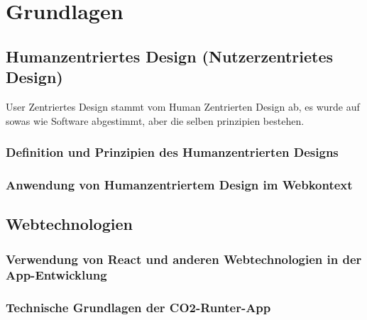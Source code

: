 
\chapter{Grundlagen}
\label{chapter:3}

\section{Humanzentriertes Design (Nutzerzentrietes Design)}

User Zentriertes Design stammt vom Human Zentrierten Design ab, es wurde auf sowas wie Software abgestimmt, aber die selben prinzipien bestehen.


\subsection{Definition und Prinzipien des Humanzentrierten Designs}

\subsection{Anwendung von Humanzentriertem Design im Webkontext}

\section{Webtechnologien}

\subsection{Verwendung von React und anderen Webtechnologien in der App-Entwicklung}

\subsection{Technische Grundlagen der CO2-Runter-App}
